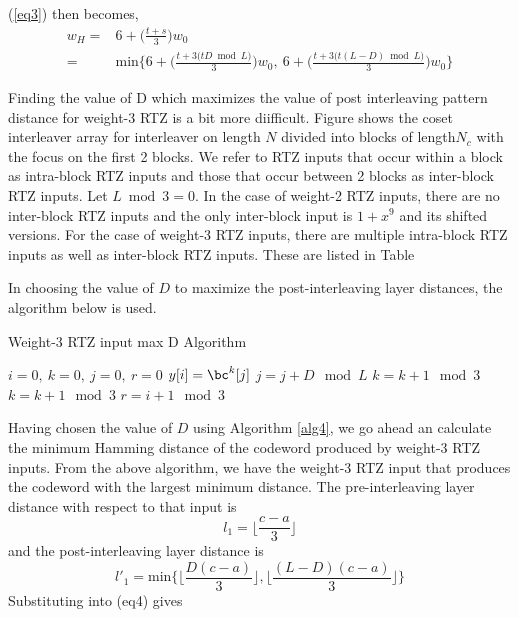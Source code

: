 \documentclass[11pt, oneside, dvipdfmx]{book}
\begin{document}
(\ref{eq3}) then becomes,
\begin{equation}
\begin{split}
w_H=&6+\Big(\frac{t+s}{3}\Big)w_0\\
=&\text{min}\Bigg\{6+\Bigg(\frac{t+3\Big(tD \bmod L\Big)}{3}\Bigg)w_0,~6+\Bigg(\frac{t+3\Big(t(L-D) \bmod L\Big)}{3}\Bigg)w_0 \Bigg\}
\end{split}
\label{eq7}
\end{equation}

Finding the value of D which maximizes the value of post interleaving pattern distance for weight-$3$ RTZ is a bit more diifficult. Figure shows the coset interleaver array for interleaver on length $N$ divided into blocks of length$N_c$ with the focus on the first 2 blocks. We refer to RTZ inputs that occur within a block as intra-block RTZ inputs and those that occur between 2 blocks as inter-block RTZ inputs. Let  $L \bmod 3 =0$. In the case of weight-2 RTZ inputs, there are no inter-block RTZ inputs and the only inter-block input is $1+x^9$ and its shifted versions. For the case of weight-3 RTZ inputs, there are multiple intra-block RTZ inputs as well as inter-block RTZ inputs. These are listed in Table

In choosing the value of $D$ to maximize the post-interleaving layer distances, the algorithm below is used. 

\begin{algorithm}
    \caption{Weight-$3$ RTZ input max D Algorithm}
    \label{alg4}
\begin{algorithmic}
    \REQUIRE	 $i=0,~k=0,~j=0,~r=0$
    \STATE $y[i] = \bc^k[j]$
    \STATE $j=j+D \mod L$
    \STATE $k=k+1 \mod 3$
    \STATE $k=k+1 \mod 3$
    \STATE $r=i+1 \mod 3$
    \ENDIF
    \ENDFOR
\end{algorithmic}
\end{algorithm}

Having chosen the value of $D$ using Algorithm \ref{alg4}, we go ahead an calculate the minimum Hamming distance of the codeword produced by weight-$3$ RTZ inputs. 
From the above algorithm, we have the weight-$3$ RTZ input that produces the codeword with the largest minimum distance. The pre-interleaving layer distance with respect to that input is
\begin{equation}
l_1 = \Big\lfloor \frac{c - a}{3} \Big\rfloor
\end{equation}
and the post-interleaving layer distance is 
\begin{equation}
l'_1 = \text{min}\Bigg\{\Big\lfloor \frac{D(c - a)}{3} \Big\rfloor, \Big\lfloor \frac{(L-D)(c - a)}{3} \Big\rfloor\Bigg\}
\end{equation}
Substituting into ({eq4}) gives
\end{document}
